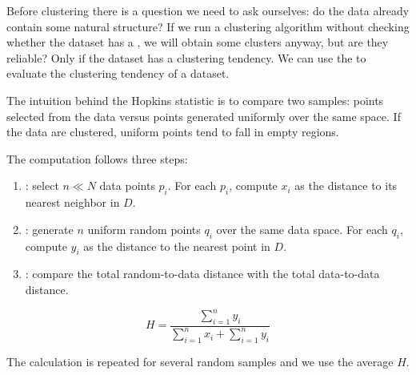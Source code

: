 Before clustering there is a question we need to ask ourselves: do the data already contain some natural structure? If we run a clustering algorithm without checking whether the dataset has a , we will obtain some clusters anyway, but are they reliable? Only if the dataset has a clustering tendency. We can use the  to evaluate the clustering tendency of a dataset.

The intuition behind the Hopkins statistic is to compare two samples: points selected from the data versus points generated uniformly over the same space. If the data are clustered, uniform points tend to fall in empty regions.

The computation follows three steps:
\begin{enumerate}
  \item {}: select $n \ll N$ data points $p_i$. For each $p_i$, compute $x_i$ as the distance to its nearest neighbor in $D$.
  \item {}: generate $n$ uniform random points $q_i$ over the same data space. For each $q_i$, compute $y_i$ as the distance to the nearest point in $D$.
  \item {}: compare the total random-to-data distance with the total data-to-data distance.
\end{enumerate}

\begin{definition}
\[
  H = \frac{\sum_{i=1}^{n} y_i}{\sum_{i=1}^{n} x_i + \sum_{i=1}^{n} y_i}
\]
\end{definition}

The calculation is repeated for several random samples and we use the average $H$.

\begin{center}
\end{center}

